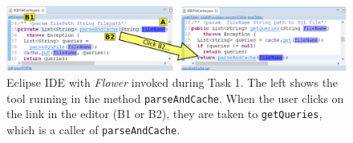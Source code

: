 \documentclass[conference]{IEEEtran}
\begin{document}
%

\begin{figure}
	\includegraphics[width=\textwidth]{images/toolScreenshot}
	\caption{Eclipse IDE with \textit{Flower} invoked during Task 1. The left shows the tool running in the method \texttt{parseAndCache}. When the user clicks on the link in the editor (B1 or B2), they are taken to \texttt{getQueries}, which is a caller of \texttt{parseAndCache}.}	
	\label{fig:tool} 
\end{figure}
\end{document}
